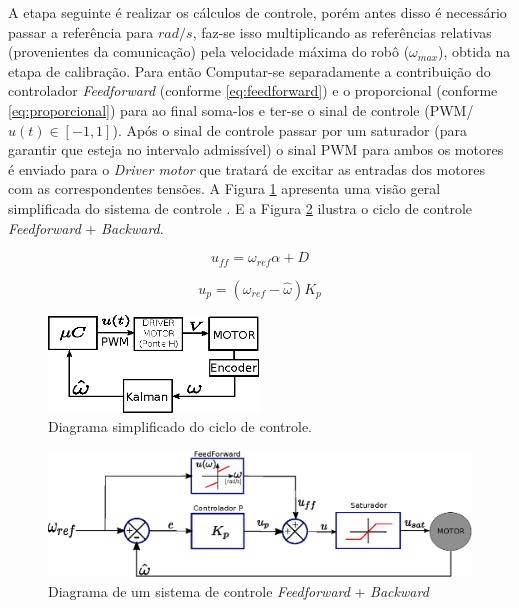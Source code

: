 A etapa seguinte é realizar os cálculos de controle, porém antes disso é necessário passar a referência para $rad/s$, faz-se isso multiplicando as referências relativas (provenientes da comunicação) pela velocidade máxima do robô ($\omega_{max}$), obtida na etapa de calibração. Para então Computar-se separadamente a contribuição do controlador \emph{Feedforward} (conforme \ref{eq:feedforward}) e o proporcional (conforme \ref{eq:proporcional}) para ao final soma-los e ter-se o sinal de controle (PWM/$u(t) \in [-1,1]$). Após o sinal de controle passar por um saturador (para garantir que esteja no intervalo admissível) o sinal PWM para ambos os motores é enviado para o \emph{Driver motor} que tratará de excitar as entradas dos motores com as correspondentes tensões. A Figura \ref{fig:diagrama_de_controle_simplificado} apresenta uma visão geral simplificada do sistema de controle . E a Figura \ref{fig:diagrama_sistema_de_controle_feedforward_backward} ilustra o ciclo de controle \emph{Feedforward} + \emph{Backward}.

\begin{equation}
    u_{ff} = \omega_{ref}\alpha + D
    \label{eq:feedforward}
\end{equation}

\begin{equation}
    u_{p} = (\omega_{ref} - \hat{\omega})K_p
    \label{eq:proporcional}
\end{equation}

\begin{figure}[H]
    \centering
    \includegraphics[width=0.5\textwidth]{figuras/ilustracoes/sistema_de_controle_embarcado.eps}
    \caption{Diagrama simplificado do ciclo de controle.}
    \label{fig:diagrama_de_controle_simplificado}
\end{figure}

\begin{figure}[H]
    \centering
    \includegraphics[width=\textwidth]{figuras/ilustracoes/sistema_de_controle_completo.eps}
    \caption{Diagrama de um sistema de controle \textit{Feedforward} + \textit{Backward}}
    \label{fig:diagrama_sistema_de_controle_feedforward_backward}
\end{figure}

